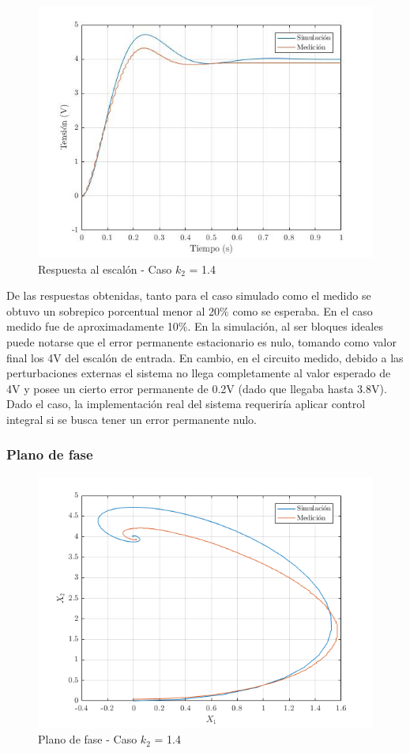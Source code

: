 \documentclass{article}
\begin{document}
\begin{figure}[H]
\centering
\includegraphics[width=0.8\linewidth]{../graficos/escalon1.jpg}
\caption{Respuesta al escalón - Caso $k_2$ = 1.4}
\label{fig:escalonNormal}
\end{figure}

De las respuestas obtenidas, tanto para el caso simulado como el medido se obtuvo un sobrepico porcentual menor al 20\% como se esperaba. En el caso medido fue de aproximadamente 10\%.
En la simulación, al ser bloques ideales puede notarse que el error permanente estacionario es nulo, tomando como valor final los 4V del escalón de entrada. En cambio, en el circuito medido, debido a las perturbaciones externas el sistema no llega completamente al valor esperado de 4V y posee un cierto error permanente de 0.2V (dado que llegaba hasta 3.8V). Dado el caso, la implementación real del sistema requeriría aplicar control integral si se busca tener un error permanente nulo.

\subsubsection{Plano de fase}

\begin{figure}[H]
\centering
\includegraphics[width=0.8\linewidth]{../graficos-xy/xy.png}
\caption{Plano de fase - Caso $k_2$ = 1.4}
\label{fig:escalonNormal}
\end{figure}
\end{document}
